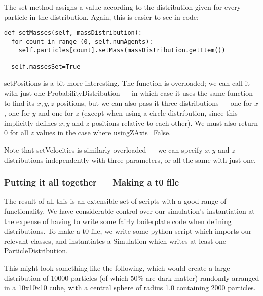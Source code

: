 \documentclass[11pt,a4paper]{article}
\begin{document}
\noindent The set method assigns a value according to the distribution given for every particle in the distribution. Again, this is easier to see in code:

\begin{lstlisting}
def setMasses(self, massDistribution):
  for count in range (0, self.numAgents):
    self.particles[count].setMass(massDistribution.getItem())

  self.massesSet=True
\end{lstlisting}

\noindent setPositions is a bit more interesting. The function is overloaded; we can call it with just one ProbabilityDistribution --- in which case it uses the same function to find its $x,y,z$ positions, but we can also pass it three distributions --- one for $x$, one for $y$ and one for $z$ (except when using a circle distribution, since this implicitly defines $x,y$ and $z$ positions relative to each other). We must also return 0 for all $z$ values in the case where usingZAxis=False.

Note that setVelocities is similarly overloaded --- we can specify $x,y$ and $z$ distributions independently with three parameters, or all the same with just one.

\subsubsection{Putting it all together --- Making a t0 file}
The result of all this is an extensible set of scripts with a good range of functionality. We have considerable control over our simulation's instantiation at the expense of having to write some fairly boilerplate code when defining distributions. To make a t0 file, we write some python script which imports our relevant classes, and instantiates a Simulation which writes at least one ParticleDistribution.

This might look something like the following, which would create a large distribution of 10000 particles (of which 50\% are dark matter) randomly arranged in a 10x10x10 cube, with a central sphere of radius 1.0 containing 2000 particles.
\end{document}

